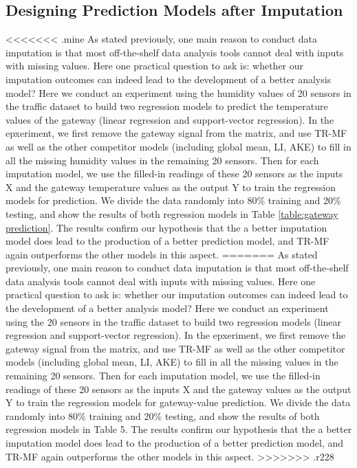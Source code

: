 \subsection{Designing Prediction Models after Imputation}\label{subsec:furtherPredict}
<<<<<<< .mine
As stated previously, one main reason to conduct data imputation is that most off-the-shelf data analysis tools cannot deal with inputs with missing values. Here one practical question to ask is: whether our imputation outcomes can indeed lead to the development of a better analysis model? Here we conduct an experiment using the humidity values of 20 sensors in the traffic dataset to build two regression models to predict the temperature values of the gateway (linear regression and support-vector regression). In the epxeriment, we first remove the gateway signal from the matrix, and use TR-MF as well as the other competitor models (including global mean, LI, AKE) to fill in all the missing humidity values in the remaining 20 sensors. Then for each imputation model, we use the filled-in readings of these 20 sensors as the inputs X and the gateway temperature values as the output Y to train the regression models for prediction. We divide the data randomly into 80\% training and 20\% testing, and show the results of both regression models in Table \ref{table:gateway prediction}. The results confirm our hypothesis that the a better imputation model does lead to the production of a better prediction model, and TR-MF again outperforms the other models in this aspect.
=======
As stated previously, one main reason to conduct data imputation is that most off-the-shelf data analysis tools cannot deal with inputs with missing values. Here one practical question to ask is: whether our imputation outcomes can indeed lead to the development of a better analysis model? Here we conduct an experiment using the 20 sensors in the traffic dataset to build two regression models (linear regression and support-vector regression). In the epxeriment, we first remove the gateway signal from the matrix, and use TR-MF as well as the other competitor models (including global mean, LI, AKE) to fill in all the missing values in the remaining 20 sensors. Then for each imputation model, we use the filled-in readings of these 20 sensors as the inputs X and the gateway values as the output Y to train the regression models for gateway-value prediction. We divide the data randomly into 80\% training and 20\% testing, and show the results of both regression models in Table 5. The results confirm our hypothesis that the a better imputation model does lead to the production of a better prediction model, and TR-MF again outperforms the other models in this aspect.
>>>>>>> .r228




